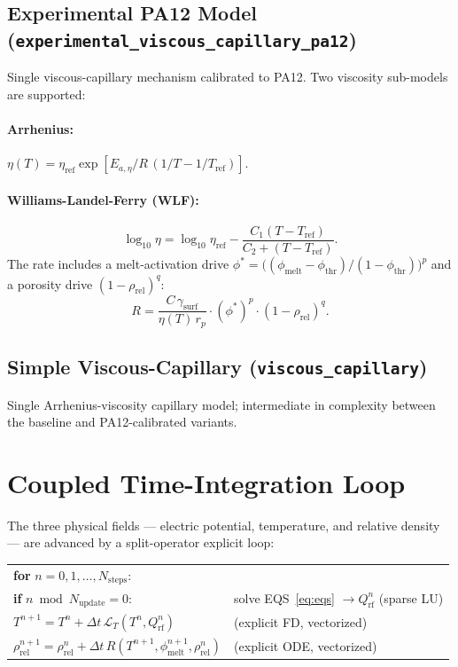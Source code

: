 \documentclass[11pt, letterpaper]{article}
\newcommand{\Qrf}{Q_{\mathrm{rf}}}
\newcommand{\rhorel}{\rho_{\mathrm{rel}}}
\newcommand{\phimelt}{\phi_{\mathrm{melt}}}
\begin{document}
\subsection{Experimental PA12 Model (\texttt{experimental\_viscous\_capillary\_pa12})}

Single viscous-capillary mechanism calibrated to PA12.
Two viscosity sub-models are supported:

\paragraph{Arrhenius:}
$\eta(T) = \eta_{\mathrm{ref}}\exp\!\left[E_{a,\eta}/R\,(1/T-1/T_{\mathrm{ref}})\right]$.

\paragraph{Williams-Landel-Ferry (WLF):}
%
\begin{equation}
  \log_{10}\eta = \log_{10}\eta_{\mathrm{ref}}
    - \frac{C_1(T-T_{\mathrm{ref}})}{C_2+(T-T_{\mathrm{ref}})}.
\end{equation}
%
The rate includes a melt-activation drive
$\phi^*=\bigl((\phimelt-\phi_{\mathrm{thr}})/(1-\phi_{\mathrm{thr}})\bigr)^p$
and a porosity drive $(1-\rhorel)^q$:
%
\begin{equation}
  R = \frac{C\,\gamma_{\mathrm{surf}}}{\eta(T)\,r_p}\cdot(\phi^*)^p\cdot(1-\rhorel)^q.
\end{equation}

\subsection{Simple Viscous-Capillary (\texttt{viscous\_capillary})}

Single Arrhenius-viscosity capillary model; intermediate in complexity
between the baseline and PA12-calibrated variants.

\section{Coupled Time-Integration Loop}

The three physical fields --- electric potential, temperature, and relative
density --- are advanced by a split-operator explicit loop:

\medskip
\noindent
\begin{tabular}{ll}
\textbf{for} $n = 0,1,\ldots,N_{\mathrm{steps}}$: & \\
\quad\textbf{if} $n \bmod N_{\mathrm{update}}=0$: &
  solve EQS~\eqref{eq:eqs} $\to \Qrf^n$ \quad(sparse LU)\\
\quad $T^{n+1} = T^n + \Delta t\,\mathcal{L}_T(T^n,\Qrf^n)$ &
  (explicit FD, vectorized)\\
\quad $\rhorel^{n+1} = \rhorel^n + \Delta t\,R(T^{n+1},\phimelt^{n+1},\rhorel^n)$ &
  (explicit ODE, vectorized)
\end{tabular}
\end{document}
